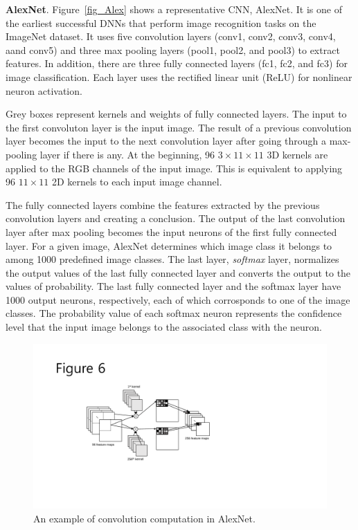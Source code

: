 {\bf AlexNet}. Figure~\ref{fig_Alex} shows a representative CNN, AlexNet\cite{krizhevsky2012imagenet}. It is one of the earliest successful DNNs that perform image recognition tasks on the ImageNet dataset\cite{DBLP:journals/corr/RussakovskyDSKSMHKKBBF14}. It uses five convolution layers (conv1, conv2, conv3, conv4, aand conv5) and three max pooling layers (pool1, pool2, and pool3) to extract features. In addition, there are three fully connected layers (fc1, fc2, and fc3) for image classification. Each layer uses the rectified linear unit (ReLU) for nonlinear neuron activation. 

Grey boxes represent kernels and weights of fully connected layers. The input to the first convoluton layer is the input image. The result of a previous convolution layer becomes the input to the next convolution layer after going through a max-pooling layer if there is any. At the beginning, 96 $3 \times 11 \times 11$ 3D kernels are applied to the RGB channels of the input image. This is equivalent to applying 96 $11 \times 11$ 2D kernels to each input image channel. 

The fully connected layers combine the features extracted by the previous convolution layers and creating a conclusion. The output of the last convolution layer after max pooling becomes the input neurons of the first fully connected layer. For a given image, AlexNet determines which image class it belongs to among 1000 predefined image classes. The last layer, \textit{softmax} layer, normalizes the output values of the last fully connected layer and converts the output to the values of probability. The last fully connected layer and the softmax layer have 1000 output neurons, respectively, each of which corrosponds to one of the image classes. The probability value of each softmax neuron represents the confidence level that the input image belongs to the associated class with the neuron.

\begin{figure}[htbp]
  \centering
  \includegraphics[width=\linewidth]{./figures/convolution}
  \caption{An example of convolution computation in AlexNet.}
  \label{fig_convolution}
\end{figure}

